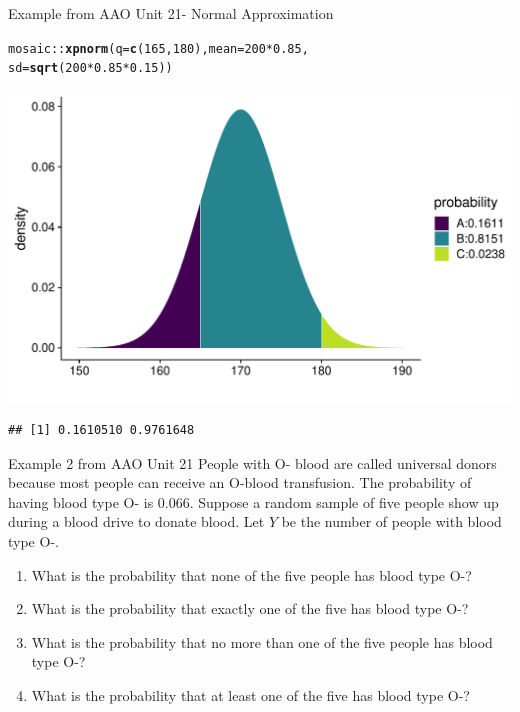 \documentclass[10pt,handout]{beamer}\usepackage[]{graphicx}\usepackage[]{color}
\makeatletter
\def\maxwidth{ %
  \ifdim\Gin@nat@width>\linewidth
    \linewidth
  \else
    \Gin@nat@width
  \fi
}
\newcommand{\hlnum}[1]{\textcolor[rgb]{0.686,0.059,0.569}{#1}}%
\newcommand{\hlopt}[1]{\textcolor[rgb]{0,0,0}{#1}}%
\newcommand{\hlstd}[1]{\textcolor[rgb]{0.345,0.345,0.345}{#1}}%
\newcommand{\hlkwc}[1]{\textcolor[rgb]{0.333,0.667,0.333}{#1}}%
\newcommand{\hlkwd}[1]{\textcolor[rgb]{0.737,0.353,0.396}{\textbf{#1}}}%
\newenvironment{kframe}{%
 \def\at@end@of@kframe{}%
 \ifinner\ifhmode%
  \def\at@end@of@kframe{\end{minipage}}%
  \begin{minipage}{\columnwidth}%
 \fi\fi%
 \def\FrameCommand##1{\hskip\@totalleftmargin \hskip-\fboxsep
 \colorbox{shadecolor}{##1}\hskip-\fboxsep
     \hskip-\linewidth \hskip-\@totalleftmargin \hskip\columnwidth}%
 \MakeFramed {\advance\hsize-\width
   \@totalleftmargin\z@ \linewidth\hsize
   \@setminipage}}%
 {\par\unskip\endMakeFramed%
 \at@end@of@kframe}
\newenvironment{knitrout}{}{} %
\makeatother
\begin{document}
\begin{frame}[fragile]{Example from AAO Unit 21- Normal Approximation}
	
\begin{knitrout}\tiny
{}\color{fgcolor}\begin{kframe}
\begin{alltt}
\hlstd{mosaic}\hlopt{::}\hlkwd{xpnorm}\hlstd{(}\hlkwc{q} \hlstd{=} \hlkwd{c}\hlstd{(}\hlnum{165}\hlstd{,}\hlnum{180}\hlstd{),} \hlkwc{mean} \hlstd{=} \hlnum{200} \hlopt{*} \hlnum{0.85}\hlstd{,}
\hlkwc{sd} \hlstd{=} \hlkwd{sqrt}\hlstd{(}\hlnum{200}\hlopt{*}\hlnum{0.85}\hlopt{*}\hlnum{0.15}\hlstd{))}
\end{alltt}
\end{kframe}

{\centering \includegraphics[width=\maxwidth]{figure/unnamed-chunk-9-1} 

}


\begin{kframe}\begin{verbatim}
## [1] 0.1610510 0.9761648
\end{verbatim}
\end{kframe}
\end{knitrout}
\end{frame}



\begin{frame}{Example 2 from AAO Unit 21}
	People with O- blood are called universal donors because most people can receive an O-blood transfusion. The probability of having blood type O- is 0.066. Suppose a random sample of five people show up during a blood drive to donate blood. Let $Y$ be the number of people with blood type O-.
	
	\begin{enumerate}
		\item What is the probability that none of the five people has blood type O-?
		\item What is the probability that exactly one of the five has blood type O-?
		\item What is the probability that no more than one of the five people has blood type O-?
		\item What is the probability that at least one of the five has blood type O-?
	\end{enumerate}
\end{frame}
\end{document}
